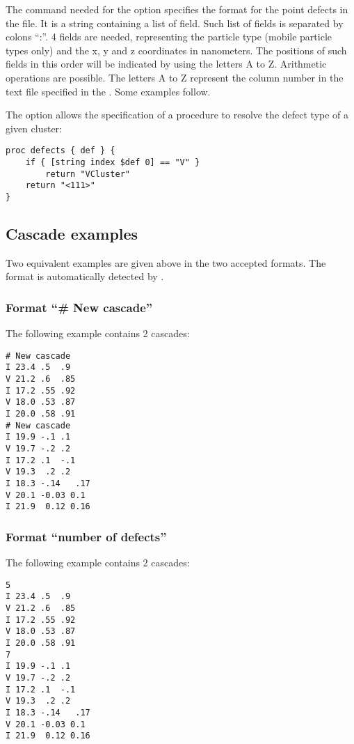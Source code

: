 The  command needed for the  option specifies the format for the point defects in the file. It is a string containing a list of field. Such list of fields is separated by colons ``:''. 4 fields are needed, representing the particle type (mobile particle types only) and the x, y and z coordinates in nanometers. The positions of such fields in this order will be indicated by using the letters A to Z. Arithmetic operations are possible. The letters A to Z represent the column number in the text file specified in the . Some examples follow.

The  option allows the specification of a procedure to resolve the defect type of a given cluster:
\begin{lstlisting}
proc defects { def } { 
	if { [string index $def 0] == "V" } 
		return "VCluster" 
	return "<111>" 
}
\end{lstlisting}

\subsection{Cascade examples}
Two equivalent examples are given above in the two accepted formats. The format is automatically detected by \MMonCa.

\subsubsection{Format ``\# New cascade''}

The following example contains 2 cascades:

\begin{lstlisting}
# New cascade
I 23.4 .5  .9
V 21.2 .6  .85
I 17.2 .55 .92
V 18.0 .53 .87
I 20.0 .58 .91
# New cascade
I 19.9 -.1 .1
V 19.7 -.2 .2
I 17.2 .1  -.1
V 19.3  .2 .2
I 18.3 -.14   .17
V 20.1 -0.03 0.1
I 21.9  0.12 0.16
\end{lstlisting}

\subsubsection{Format ``number of defects''}

The following example contains 2 cascades:

\begin{lstlisting}
5
I 23.4 .5  .9
V 21.2 .6  .85
I 17.2 .55 .92
V 18.0 .53 .87
I 20.0 .58 .91
7
I 19.9 -.1 .1
V 19.7 -.2 .2
I 17.2 .1  -.1
V 19.3  .2 .2
I 18.3 -.14   .17
V 20.1 -0.03 0.1
I 21.9  0.12 0.16
\end{lstlisting}

